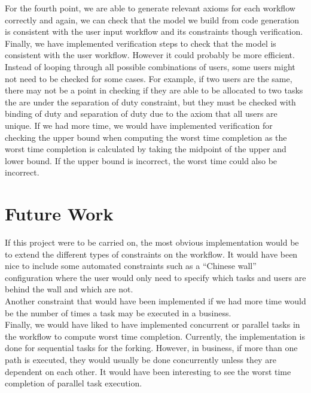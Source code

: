 \documentclass[a4paper]{report}
\begin{document}
For the fourth point, we are able to generate relevant axioms for each workflow correctly and again, we can check that the model we build from code generation is consistent with the user input workflow and its constraints though verification.\\

Finally, we have implemented verification steps to check that the model is consistent with the user workflow. However it could probably be more efficient. Instead of looping through all possible combinations of users, some users might not need to be checked for some cases. For example, if two users are the same, there may not be a point in checking if they are able to be allocated to two tasks the are under the separation of duty constraint, but they must be checked with binding of duty and separation of duty due to the axiom that all users are unique. If we had more time, we would have implemented verification for checking the upper bound when computing the worst time completion as the worst time completion is calculated by taking the midpoint of the upper and lower bound. If the upper bound is incorrect, the worst time could also be incorrect. \\

\section{Future Work}
If this project were to be carried on, the most obvious implementation would be to extend the different types of constraints on the workflow. It would have been nice to include some automated constraints such as a ``Chinese wall'' configuration where the user would only need to specify which tasks and users are behind the wall and which are not. \\

Another constraint that would have been implemented if we had more time would be the number of times a task may be executed in a business. \\

Finally, we would have liked to have implemented concurrent or parallel tasks in the workflow to compute worst time completion. Currently, the implementation is done for sequential tasks for the forking. However, in business, if more than one path is executed, they would usually be done concurrently unless they are dependent on each other. It would have been interesting to see the worst time completion of parallel task execution. \\
\end{document}
